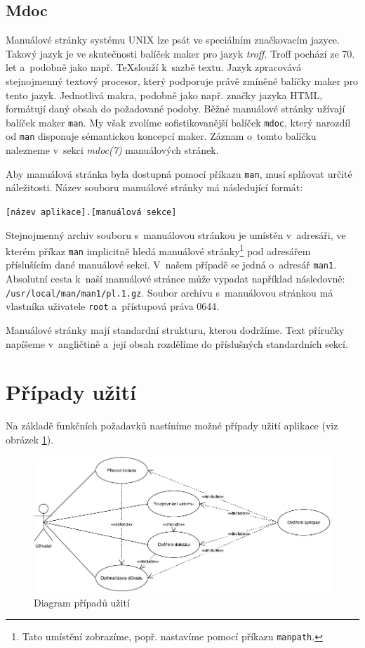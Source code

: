 \documentclass[thesis=B,czech,hidelinks]{thesis}[2012/06/26]
\begin{document}
\subsection{Mdoc}

Manuálové stránky systému UNIX lze psát ve speciálním značkovacím jazyce. Takový jazyk je ve skutečnosti balíček maker pro jazyk \emph{troff}. Troff pochází ze 70. let a~podobně jako např. \TeX slouží k~sazbě textu. Jazyk zpracovává stejnojmenný textový procesor, který podporuje právě zmíněné balíčky maker pro tento jazyk. Jednotlivá makra, podobně jako např. značky jazyka HTML, formátují daný obsah do požadované podoby\cite{troff}. Běžné manuálové stránky užívají balíček maker \texttt{man}. My však zvolíme sofistikovanější balíček \texttt{mdoc}, který narozdíl od \texttt{man} disponuje sémantickou koncepcí maker. Záznam o~tomto balíčku nalezneme v~sekci \emph{mdoc(7)} manuálových stránek\cite{mdoc}.

Aby manuálová stránka byla dostupná pomocí příkazu \texttt{man}, musí splňovat určité náležitosti. Název souboru manuálové stránky má následující formát:

\begin{center}
\texttt{[název aplikace].[manuálová sekce]}
\end{center}

Stejnojmenný archiv souboru s~manuálovou stránkou je umístěn v~adresáři, ve kterém příkaz \texttt{man} implicitně hledá manuálové stránky\footnote{Tato umístění zobrazíme, popř. nastavíme pomocí příkazu \texttt{manpath}.} pod adresářem příslušícím dané manuálové sekci. V~našem případě se jedná o~adresář \texttt{man1}. Absolutní cesta k~naší manuálové stránce může vypadat například následovně: \texttt{/usr/local/man/man1/pl.1.gz}. Soubor archivu s~manuálovou stránkou má vlastníka uživatele \texttt{root} a~přístupová práva 0644.

Manuálové stránky mají standardní strukturu, kterou dodržíme. Text příručky napíšeme v~angličtině a~její obsah rozdělíme do příslušných standardních sekcí.

\section{Případy užití}

Na základě funkčních požadavků nastíníme možné případy užití aplikace (viz obrázek \ref{fig:use_cases}).

\begin{figure}
\centering
\caption{Diagram případů užití}
\label{fig:use_cases}
\includegraphics[width=\linewidth]{diagrams/use_cases}
\end{figure}
\end{document}
